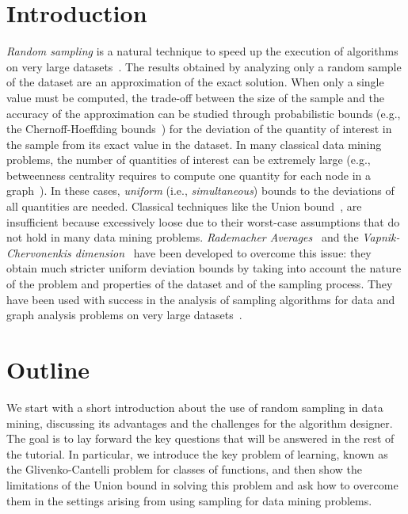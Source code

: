 \documentclass{sig-alternate-2013}
\begin{document}
\section{Introduction}\label{introduction}
\emph{Random sampling} is a natural technique to speed up the execution of
algorithms on very large datasets~\citep{CormodeD14}. The results obtained by
analyzing only a random sample of the dataset are an approximation of the exact
solution.  When only a single value must be computed, the trade-off between the
size of the sample and the accuracy of the approximation can be studied through
probabilistic bounds (e.g., the Chernoff-Hoeffding
bounds~\citep{Hoeffding63}) for the deviation of the quantity of interest in
the sample from its exact value in the dataset. In many classical data mining
problems, the number of quantities of interest can be extremely large (e.g.,
betweenness centrality requires to compute one quantity for each node in a
graph~\citep{Brandes01,RiondatoK14}). In these cases, \emph{uniform} (i.e.,
\emph{simultaneous}) bounds to the deviations of all quantities are needed.
Classical techniques like the Union bound~\citep{MitzenmacherU05}, are
insufficient because excessively loose due to their worst-case assumptions that
do not hold in many data mining problems. \emph{Rademacher
Averages}~\citep{BoucheronBL05} and the \emph{Vapnik-Chervonenkis
dimension}~\citep{Vapnik99} have been developed to overcome this issue: they
obtain much stricter uniform deviation bounds by taking into account the nature
of the problem and properties of the dataset and of the sampling process. They
have been used with success in the analysis of sampling algorithms for data and
graph analysis problems on very large
datasets~\citep{RiondatoU14,RiondatoU15,RiondatoK14,RiondatoV14,XXX}.

\section{Outline}\label{sec:outline}
We start with a short introduction about the use of random sampling in data
mining, discussing its advantages and the challenges for the algorithm designer.
The goal is to lay forward the key questions that will be answered in the rest
of the tutorial. In particular, we introduce the key problem of learning, known
as the Glivenko-Cantelli problem for classes of functions, and then show the
limitations of the Union bound in solving this problem and ask how to overcome
them in the settings arising from using sampling for data mining problems.
\end{document}
